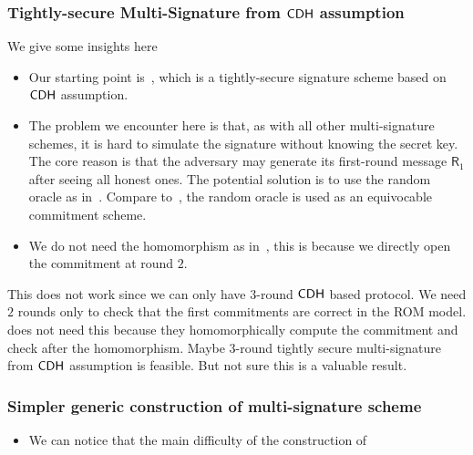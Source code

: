 \subsubsection{Tightly-secure Multi-Signature from $\mathsf{CDH}$ assumption}
We give some insights here
\begin{itemize}
    \item Our starting point is~\cite{C:Chevallier-Mames05}, which is a tightly-secure signature scheme based on $\mathsf{CDH}$ assumption.
    \item The problem we encounter here is that, as with all other multi-signature schemes, it is hard to simulate the signature without knowing the secret key. The core reason is that the adversary may generate its first-round message  $\mathsf{R}_1$ after seeing all honest ones. The potential solution is to use the random oracle as in~\cite{CCS:BelNev06}. Compare to~\cite{EC:PanWag23}, the random oracle is used as an equivocable commitment scheme.
    \item We do not need the homomorphism as in~\cite{EC:PanWag23}, this is because we directly open the commitment at round $2$. 
\end{itemize}

This does not work since we can only have $3$-round $\mathsf{CDH}$ based protocol. We need $2$ rounds only to check that the first commitments are correct in the ROM model. \cite{EC:PanWag23} does not need this because they homomorphically compute the commitment and check after the homomorphism. Maybe $3$-round tightly secure multi-signature from $\mathsf{CDH}$ assumption is feasible. But not sure this is a valuable result.

\subsubsection{Simpler generic construction of multi-signature scheme}

\begin{itemize}
    \item We can notice that the main difficulty of the construction of 
\end{itemize}